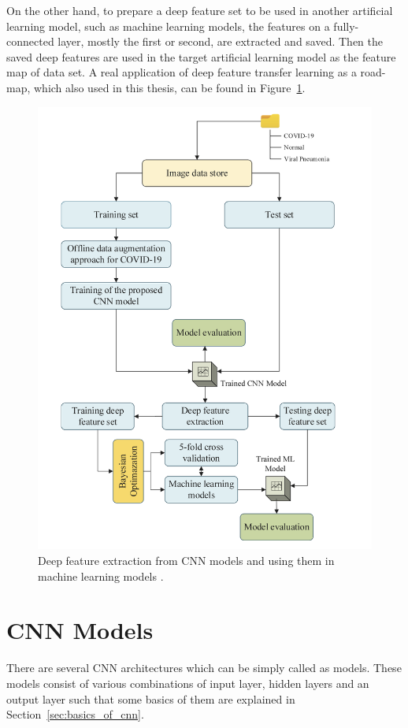 On the other hand, to prepare a deep feature set to be used in another artificial learning model, such as machine learning models, the features on a fully-connected layer, mostly the first or second, are extracted and saved. Then the saved deep features are used in the target artificial learning model as the feature map of data set. A real application of deep feature transfer learning as a road-map, which also used in this thesis, can be found in Figure~\ref{fig:A_novelCNNModel_architecture}.

\begin{figure}[h]
	\centering
	\includegraphics[width=.8\linewidth]{fig/deepfeauter_usage.png}
	\caption{Deep feature extraction from CNN models and using them in machine learning models \cite{A_novelCNNModel}.}
	\label{fig:A_novelCNNModel_architecture}
\end{figure}

\section{CNN Models}

There are several CNN architectures which can be simply called as models. These models consist of various combinations of input layer, hidden layers and an output layer such that some basics of them are explained in Section~\ref{sec:basics_of_cnn}.

